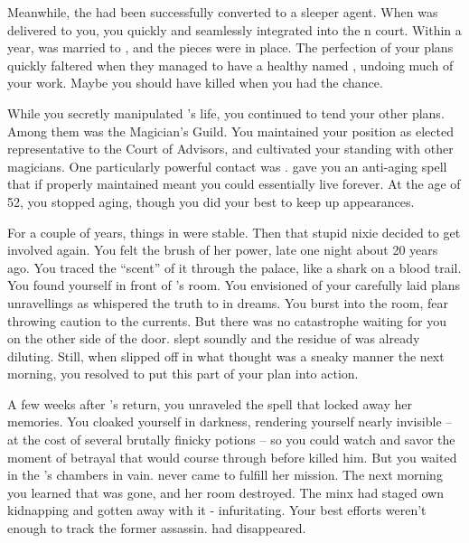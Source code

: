 \documentclass[char]{NeptuneBall}
\begin{document}
Meanwhile, the \cQueen{\kid} had been successfully converted to a sleeper agent. When \cQueen{} was delivered to you, you quickly and seamlessly integrated \cQueen{\them} into the \pAtlantis{}n court. Within a year, \cKing{} was married to \cQueen{}, and the pieces were in place. The perfection of your plans quickly faltered when they managed to have a healthy \cAriel{\offspring} named \cAriel{}, undoing much of your work. Maybe you should have killed \cKing{} when you had the chance.

While you secretly manipulated \cKing{\King} \cKing{}'s life, you continued to tend your other plans. Among them was the Magician's Guild. You maintained your position as elected representative to the Court of Advisors, and cultivated your standing with other magicians. One particularly powerful contact was \cWitch{}. \cWitch{\They} gave you an anti-aging spell that if properly maintained meant you could essentially live forever. At the age of 52, you stopped aging, though you did your best to keep up appearances.

For a couple of years, things in \pAtlantis{} were stable. Then that stupid nixie decided to get involved again. You felt the brush of her power, late one night about 20 years ago. You traced the ``scent'' of it through the palace, like a shark on a blood trail. You found yourself in front of \cQueen{}'s room. You envisioned of your carefully laid plans unravellings as \cNixie{} whispered the truth to \cQueen{} in dreams. You burst into the room, fear throwing caution to the currents. But there was no catastrophe waiting for you on the other side of the door. \cQueen{} slept soundly and the residue of \cNixie{} was already diluting. Still, when \cQueen{} slipped off in what \cQueen{\they} thought was a sneaky manner the next morning, you resolved to put this part of your plan into action.

A few weeks after \cQueen{}'s return, you unraveled the spell that locked away her memories. You cloaked yourself in darkness, rendering yourself nearly invisible -- at the cost of several brutally finicky potions -- so you could watch and savor the moment of betrayal that would course through \cKing{} before \cQueen{} killed him. But you waited in the \cKing{\King}'s chambers in vain. \cQueen{} never came to fulfill her mission. The next morning you learned that \cQueen{\they} was gone, and her room destroyed. The minx had staged \cQueen{\them} own kidnapping and gotten away with it - infuritating. Your best efforts weren't enough to track the former assassin. \cQueen{\They} had disappeared.
\end{document}
